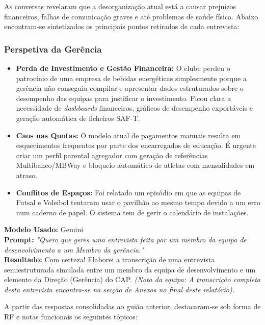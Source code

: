 \documentclass[a4paper,12pt]{scrreprt}
\newcommand{\caixaprompt}[3]{
    \begin{tcolorbox}[
        enhanced,
        colback=azulclaro,      %
        colframe=blue!50!black, %
        arc=2mm,                %
        boxrule=0.5mm,          %
        title=\textbf{Documentação de IA}, %
        fonttitle=\sffamily,
        coltitle=black,
        attach title to upper,
        after title={\par\medskip},
    ]
        \textbf{Modelo Usado:} #1 \\
        \textbf{Prompt:} \textit{"#2"} \\
        \tcbline %
        \textbf{Resultado:} #3
    \end{tcolorbox}
}
\begin{document}
{As conversas revelaram que a desorganização atual está a causar prejuízos financeiros, falhas de comunicação graves e até problemas de saúde física. Abaixo encontram-se sintetizados os principais pontos retirados de cada entrevista:

\subsubsection*{Perspetiva da Gerência}
\begin{itemize}
    \item \textbf{Perda de Investimento e Gestão Financeira:} O clube perdeu o patrocínio de uma empresa de bebidas energéticas simplesmente porque a gerência não conseguiu compilar e apresentar dados estruturados sobre o desempenho das equipas para justificar o investimento. Ficou clara a necessidade de \textit{dashboards} financeiros, gráficos de desempenho exportáveis e geração automática de ficheiros SAF-T.
    \item \textbf{Caos nas Quotas:} O modelo atual de pagamentos manuais resulta em esquecimentos frequentes por parte dos encarregados de educação. É urgente criar um perfil parental agregador com geração de referências Multibanco/MBWay e bloqueio automático de atletas com mensalidades em atraso.
    \item \textbf{Conflitos de Espaços:} Foi relatado um episódio em que as equipas de Futsal e Voleibol tentaram usar o pavilhão ao mesmo tempo devido a um erro num caderno de papel. O sistema tem de gerir o calendário de instalações.
\end{itemize}

\caixaprompt{Gemini}{Quero que geres uma entrevista feita por um membro da equipa de desenvolvimento a um Membro da gerência.}{Com certeza! Elaborei a transcrição de uma entrevista semiestruturada simulada entre um membro da equipa de desenvolvimento e um elemento da Direção (Gerência) do CAP. \textit{(Nota da equipa: A transcrição completa desta entrevista encontra-se na secção de Anexos no final deste relatório).}}



A partir das respostas consolidadas ao guião anterior, destacaram‑se sob forma de RF e notas funcionais os seguintes tópicos:

}
\end{document}
